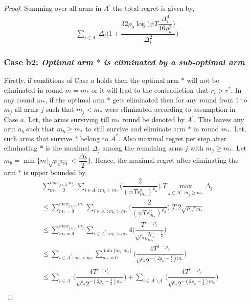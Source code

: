 \begin{proof}
Summing over all arms in $A^{'}$ the total regret is given by, 
\begin{align*}
\sum_{i\in A^{'}}\Delta_{i}\bigg(1+\dfrac{32\rho_{a}\log{(\psi T\dfrac{\Delta_{i}^{4}}{16\rho_{a}^{2}}})}{\Delta_{i}^{2}}\bigg)
\end{align*}

\subsubsection*{Case b2: \textit{Optimal arm ${*}$ is eliminated by a sub-optimal arm  }}


	Firstly, if conditions of Case $a$ holds then the optimal arm ${*}$ will not be eliminated in round $m=m_{*}$ or it will lead to the contradiction that $r_{i}>r^{*}$. In any round $m_{*}$, if the optimal arm ${*}$ gets eliminated then for any round from $1$ to $m_{j}$ all arms ${j}$ such that $m_{j}< m_{*}$ were eliminated according to assumption in Case $a$. Let, the arms surviving till $m_{*}$ round be denoted by $A^{'}$. This leaves any arm $a_{b}$ such that $m_{b}\geq m_{*}$ to still survive and eliminate arm ${*}$ in round $m_{*}$. Let, such arms that survive ${*}$ belong to $A^{''}$. Also maximal regret per step after eliminating ${*}$ is the maximal $\Delta_{j}$ among the remaining arms ${j}$ with $m_{j}\geq m_{*}$.  Let $m_{b}=\min\lbrace m|\sqrt{\rho_{a}\epsilon_{m}}<\dfrac{\Delta_{b}}{2}\rbrace$. Hence, the maximal regret after eliminating the arm ${*}$ is upper bounded by, 
\begin{align*}
&\sum_{m_{*}=0}^{max_{j\in A^{'}}m_{j}}\sum_{i\in A^{''}:m_{i}>m_{*}}\bigg(\dfrac{2}{(\psi  T\epsilon_{m_{*}}^{2})^{\rho_{a}}} \bigg).T\max_{j\in A^{''}:m_{j}\geq m_{*}}{\Delta}_{j}\\
&\leq\sum_{m_{*}=0}^{max_{j\in A^{'}}m_{j}}\sum_{i\in A^{''}:m_{i}>m_{*}}\bigg(\dfrac{2}{(\psi  T\epsilon_{m_{*}}^{2})^{\rho_{a}}} \bigg).T.2\sqrt{\rho_{a}\epsilon_{m_{*}}}\\
&\leq\sum_{m_{*}=0}^{max_{j\in A^{'}}m_{j}}\sum_{i\in A^{''}:m_{i}>m_{*}}4\bigg(\dfrac{T^{1-\rho_{a}}}{\psi^{\rho_{a}}\epsilon_{m_{*}}^{2\rho_{a}-\frac{1}{2}}} \bigg)\\
&\leq\sum_{i\in A^{''}:m_{i}>m_{*}}\sum_{m_{*}=0}^{\min{\lbrace m_{i},m_{b}\rbrace}}\bigg(\dfrac{4T^{1-\rho_{a}}}{\psi^{\rho_{a}}2^{-(2\rho_{a}-\frac{1}{2})m_{*}}} \bigg)\\
&\leq\sum_{i\in A^{'}}\bigg(\dfrac{4T^{1-\rho_{a}}}{\psi^{\rho_{a}}2^{-(2\rho_{a}-\frac{1}{2})m_{*}}} \bigg)+\sum_{i\in A^{''}\setminus A^{'}}\bigg(\dfrac{4T^{1-\rho_{a}}}{\psi^{\rho_{a}}2^{-(2\rho_{a}-\frac{1}{2})m_{b}}} \bigg)\\

\end{align*}
\end{proof}
